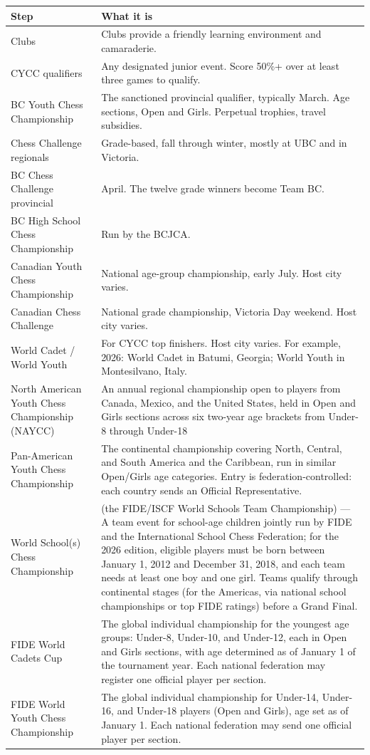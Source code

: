 \documentclass[10pt,letterpaper]{article}
\begin{document}
\begin{center}
\begin{tabularx}{\textwidth}{@{}p{}X@{}}
\toprule
\textbf{Step} & \textbf{What it is} \\
\midrule
Clubs & Clubs provide a friendly learning environment and camaraderie. \\
CYCC qualifiers & Any designated junior event. Score 50\%+ over at least three
games to qualify. \\
BC Youth Chess Championship & The sanctioned provincial qualifier, typically
March. Age sections, Open and Girls. Perpetual trophies, travel subsidies. \\
Chess Challenge regionals & Grade-based, fall through winter, mostly at UBC and
in Victoria. \\
BC Chess Challenge provincial & April. The twelve grade winners become Team BC. \\
BC High School Chess Championship & Run by the BCJCA. \\
Canadian Youth Chess Championship & National age-group championship, early July.
Host city varies. \\
Canadian Chess Challenge & National grade championship, Victoria Day weekend. Host city varies. \\
World Cadet / World Youth & For CYCC top finishers. Host city varies. For example, 2026: World Cadet in
Batumi, Georgia; World Youth in Montesilvano, Italy. \\
North American Youth Chess Championship (NAYCC) & An annual regional championship open to players from Canada, Mexico, and the United States, held in Open and Girls sections across six two-year age brackets from Under-8 through Under-18 \\
Pan-American Youth Chess Championship & The continental championship covering North, Central, and South America and the Caribbean, run in similar Open/Girls age categories. Entry is federation-controlled: each country sends an Official Representative. \\
World School(s) Chess Championship & (the FIDE/ISCF World Schools Team Championship) — A team event for school-age children jointly run by FIDE and the International School Chess Federation; for the 2026 edition, eligible players must be born between January 1, 2012 and December 31, 2018, and each team needs at least one boy and one girl. Teams qualify through continental stages (for the Americas, via national school championships or top FIDE ratings) before a Grand Final. \\
FIDE World Cadets Cup & The global individual championship for the youngest age groups: Under-8, Under-10, and Under-12, each in Open and Girls sections, with age determined as of January 1 of the tournament year. Each national federation may register one official player per section. \\
FIDE World Youth Chess Championship & The global individual championship for Under-14, Under-16, and Under-18 players (Open and Girls), age set as of January 1. Each national federation may send one official player per section. \\
\bottomrule
\end{tabularx}
\end{center}
\end{document}
